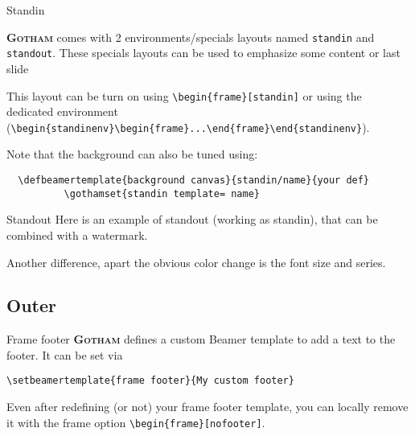 \documentclass[aspectratio=169]{beamer}
\newcommand{\themename}{\textbf{\textsc{Gotham}}}
\begin{document}
	\begin{standinenv}
	\begin{frame}[fragile]{Standin}

		\themename{} comes with 2 environments/specials layouts named \verb|standin| and \verb|standout|.
		These specials layouts can be used to emphasize some content or last slide\textellipsis

		This layout can be turn on using \verb|\begin{frame}[standin]| or using the dedicated environment (\verb|\begin{standinenv}\begin{frame}...\end{frame}\end{standinenv}|).

		Note that the background can also be tuned using:
		\begin{verbatim}  \defbeamertemplate{background canvas}{standin/name}{your def}
		  \gothamset{standin template= name}\end{verbatim}
		
	\end{frame}
	\end{standinenv}

	\begin{frame}{Standout}
		Here is an example of standout (working as standin), that can be combined with a watermark.

		Another difference, apart the obvious color change is the font size and series.
	\end{frame}


\subsection{Outer}
	
	{%
	\begin{frame}[fragile]{Frame footer}
	   \themename{} defines a custom Beamer template to add a text to the footer. 
		It can be set via
	   \begin{verbatim}\setbeamertemplate{frame footer}{My custom footer}\end{verbatim}

		Even after redefining (or not) your frame footer template, you can locally remove it with the frame option \verb|\begin{frame}[nofooter]|.
	\end{frame}
	}
\end{document}
